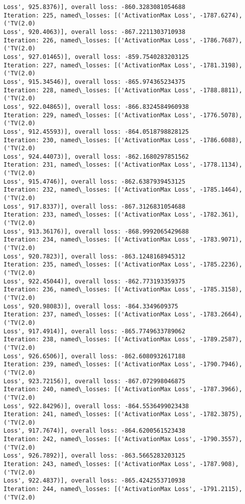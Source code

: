 \documentclass[10pt]{article}
\begin{document}
\begin{Verbatim}[commandchars=\\\{\}]
Loss', 925.8376)], overall loss: -860.3283081054688
Iteration: 225, named\_losses: [('ActivationMax Loss', -1787.6274), ('TV(2.0)
Loss', 920.4063)], overall loss: -867.2211303710938
Iteration: 226, named\_losses: [('ActivationMax Loss', -1786.7687), ('TV(2.0)
Loss', 927.01465)], overall loss: -859.7540283203125
Iteration: 227, named\_losses: [('ActivationMax Loss', -1781.3198), ('TV(2.0)
Loss', 915.34546)], overall loss: -865.974365234375
Iteration: 228, named\_losses: [('ActivationMax Loss', -1788.8811), ('TV(2.0)
Loss', 922.04865)], overall loss: -866.8324584960938
Iteration: 229, named\_losses: [('ActivationMax Loss', -1776.5078), ('TV(2.0)
Loss', 912.45593)], overall loss: -864.0518798828125
Iteration: 230, named\_losses: [('ActivationMax Loss', -1786.6088), ('TV(2.0)
Loss', 924.44073)], overall loss: -862.1680297851562
Iteration: 231, named\_losses: [('ActivationMax Loss', -1778.1134), ('TV(2.0)
Loss', 915.4746)], overall loss: -862.6387939453125
Iteration: 232, named\_losses: [('ActivationMax Loss', -1785.1464), ('TV(2.0)
Loss', 917.8337)], overall loss: -867.3126831054688
Iteration: 233, named\_losses: [('ActivationMax Loss', -1782.361), ('TV(2.0)
Loss', 913.36176)], overall loss: -868.9992065429688
Iteration: 234, named\_losses: [('ActivationMax Loss', -1783.9071), ('TV(2.0)
Loss', 920.7823)], overall loss: -863.1248168945312
Iteration: 235, named\_losses: [('ActivationMax Loss', -1785.2236), ('TV(2.0)
Loss', 922.45044)], overall loss: -862.773193359375
Iteration: 236, named\_losses: [('ActivationMax Loss', -1785.3158), ('TV(2.0)
Loss', 920.98083)], overall loss: -864.3349609375
Iteration: 237, named\_losses: [('ActivationMax Loss', -1783.2664), ('TV(2.0)
Loss', 917.4914)], overall loss: -865.7749633789062
Iteration: 238, named\_losses: [('ActivationMax Loss', -1789.2587), ('TV(2.0)
Loss', 926.6506)], overall loss: -862.6080932617188
Iteration: 239, named\_losses: [('ActivationMax Loss', -1790.7946), ('TV(2.0)
Loss', 923.72156)], overall loss: -867.072998046875
Iteration: 240, named\_losses: [('ActivationMax Loss', -1787.3966), ('TV(2.0)
Loss', 922.84296)], overall loss: -864.5536499023438
Iteration: 241, named\_losses: [('ActivationMax Loss', -1782.3875), ('TV(2.0)
Loss', 917.7674)], overall loss: -864.6200561523438
Iteration: 242, named\_losses: [('ActivationMax Loss', -1790.3557), ('TV(2.0)
Loss', 926.7892)], overall loss: -863.5665283203125
Iteration: 243, named\_losses: [('ActivationMax Loss', -1787.908), ('TV(2.0)
Loss', 922.4837)], overall loss: -865.4242553710938
Iteration: 244, named\_losses: [('ActivationMax Loss', -1791.2115), ('TV(2.0)

\end{Verbatim}
\end{document}
